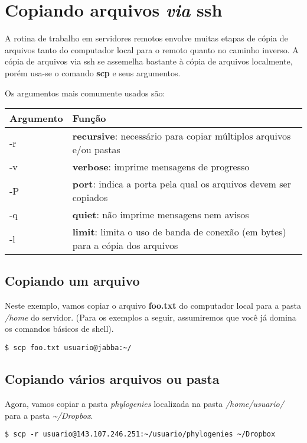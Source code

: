\documentclass[]{article}
\begin{document}
\section{\texorpdfstring{Copiando arquivos \emph{via}
ssh}{Copiando arquivos via ssh}}\label{copiando-arquivos-via-ssh}

A rotina de trabalho em servidores remotos envolve muitas etapas de
cópia de arquivos tanto do computador local para o remoto quanto no
caminho inverso. A cópia de arquivos via ssh se assemelha bastante à
cópia de arquivos localmente, porém usa-se o comando \textbf{scp} e seus
argumentos.

Os argumentos mais comumente usados são:

\begin{longtable}[c]{@{}ll@{}}
\toprule
Argumento & Função\tabularnewline
\midrule
\endhead
-r & \textbf{recursive}: necessário para copiar múltiplos arquivos e/ou
pastas\tabularnewline
-v & \textbf{verbose}: imprime mensagens de progresso\tabularnewline
-P & \textbf{port}: indica a porta pela qual os arquivos devem ser
copiados\tabularnewline
-q & \textbf{quiet}: não imprime mensagens nem avisos\tabularnewline
-l & \textbf{limit}: limita o uso de banda de conexão (em bytes) para a
cópia dos arquivos\tabularnewline
\bottomrule
\end{longtable}

\subsection{Copiando um arquivo}\label{copiando-um-arquivo}

Neste exemplo, vamos copiar o arquivo \textbf{foo.txt} do computador
local para a pasta \emph{/home} do servidor. (Para os exemplos a seguir,
assumiremos que você já domina os comandos básicos de shell).

\begin{verbatim}
$ scp foo.txt usuario@jabba:~/
\end{verbatim}

\subsection{Copiando vários arquivos ou
pasta}\label{copiando-varios-arquivos-ou-pasta}

Agora, vamos copiar a pasta \emph{phylogenies} localizada na pasta
\emph{/home/usuario/} para a pasta \emph{\textasciitilde{}/Dropbox}.

\begin{verbatim}
$ scp -r usuario@143.107.246.251:~/usuario/phylogenies ~/Dropbox
\end{verbatim}
\end{document}

